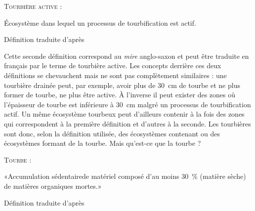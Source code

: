 \begin{pdef}
\textsc{Tourbière active} :

Écosystème dans lequel un processus de tourbification est actif.

\hfill {\scriptsize Définition traduite d'après \citet{joosten2002}}
\end{pdef}
Cette seconde définition correspond au \textit{mire} anglo-saxon et peut être traduite en français par le terme de tourbière active.
Les concepts derrière ces deux définitions se chevauchent mais ne sont pas complètement similaires : une tourbière drainée peut, par exemple, avoir plus de \SI{30}{cm} de tourbe et ne plus former de tourbe, ne plus être active.
À l'inverse il peut exister des zones où l'épaisseur de tourbe est inférieure à \SI{30}{cm} malgré un processus de tourbification actif.
Un même écosystème tourbeux peut d'ailleurs contenir à la fois des zones qui correspondent à la première définition et d'autres à la seconde.
Les tourbières sont donc, selon la définition utilisée, des écosystèmes contenant ou des écosystèmes formant de la tourbe.
Mais qu'est-ce que la tourbe ?

\begin{pdef}
\textsc{Tourbe} :

«Accumulation sédentaire\footnotemark de matériel composé d'au moins \SI{30}{\percent} (matière sèche) de matières organiques mortes.»

\hfill {\scriptsize Définition traduite d'après \citet{joosten2002}}
\end{pdef}

